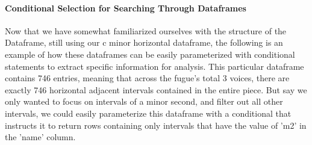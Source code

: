 \paragraph{Conditional Selection for Searching Through
Dataframes}\label{conditional-selection-for-searching-through-dataframes}

Now that we have somewhat familiarized ourselves with the structure of
the Dataframe, still using our c minor horizontal dataframe, the
following is an example of how these dataframes can be easily
parameterized with conditional statements to extract specific
information for analysis. This particular dataframe contains 746
entries, meaning that across the fugue's total 3 voices, there are
exactly 746 horizontal adjacent intervals contained in the entire piece.
But say we only wanted to focus on intervals of a minor second, and
filter out all other intervals, we could easily parameterize this
dataframe with a conditional that instructs it to return rows containing
only intervals that have the value of 'm2' in the 'name' column.

